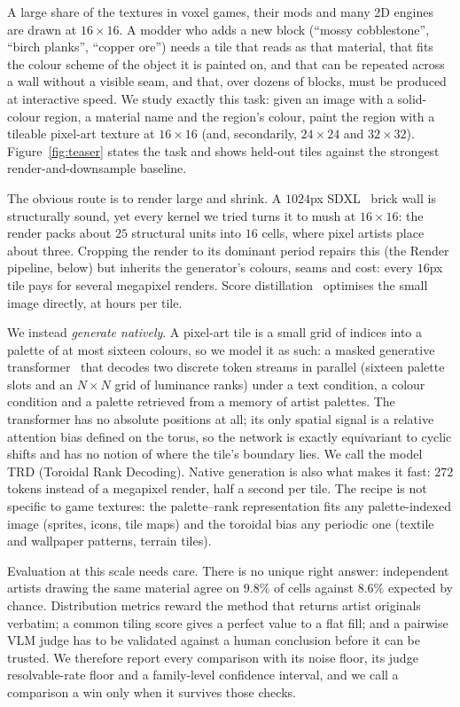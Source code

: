 \documentclass{article}
\newcommand{\trd}{\textsc{TRD}}
\begin{document}
A large share of the textures in voxel games, their mods and many 2D engines
are drawn at $16\times16$. A modder who adds a new block (``mossy
cobblestone'', ``birch planks'', ``copper ore'') needs a tile that reads as
that material, that fits the colour scheme of the object it is painted on, and
that can be repeated across a wall without a visible seam, and that, over
dozens of blocks, must be produced at interactive speed. We study exactly
this task: given an image with a solid-colour region, a material name and the
region's colour, paint the region with a tileable pixel-art texture at
$16\times16$ (and, secondarily, $24\times24$ and $32\times32$).
Figure~\ref{fig:teaser} states the task and shows held-out tiles against the
strongest render-and-downsample baseline.

The obvious route is to render large and shrink. A $1024$px SDXL~\citep{podell2024sdxl}
brick wall is structurally sound, yet every kernel we tried turns it to mush
at $16\times16$: the render packs about $25$ structural units into $16$ cells,
where pixel artists place about three. Cropping the render to its dominant
period repairs this (the Render pipeline, below) but inherits the generator's colours,
seams and cost: every $16$px tile pays for several megapixel renders.
Score distillation~\citep{binninger2024sdpixl} optimises the small image
directly, at hours per tile.

We instead \emph{generate natively}. A pixel-art tile is a small grid of
indices into a palette of at most sixteen colours, so we model it as such: a
masked generative transformer~\citep{chang2022maskgit} that decodes two
discrete token streams in parallel (sixteen palette slots and an $N\times N$
grid of luminance ranks) under a text condition, a colour condition and a
palette retrieved from a memory of artist palettes. The transformer has no
absolute positions at all; its only spatial signal is a relative attention
bias defined on the torus, so the network is exactly equivariant to cyclic
shifts and has no notion of where the tile's boundary lies. We call the model
\trd{} (Toroidal Rank Decoding). Native generation is also what makes it
fast: $272$ tokens instead of a megapixel render, half a second per tile.
The recipe is not specific to game textures: the palette--rank representation
fits any palette-indexed image (sprites, icons, tile maps) and the toroidal
bias any periodic one (textile and wallpaper patterns, terrain tiles).

Evaluation at this scale needs care. There is no unique right answer: independent artists drawing the same material agree on
$9.8\%$ of cells against $8.6\%$ expected by chance. Distribution metrics
reward the method that returns artist originals verbatim; a common tiling score
gives a perfect value to a flat fill; and a pairwise VLM judge has to be
validated against a human conclusion before it can be trusted. We
therefore report every comparison with its noise floor, its judge
resolvable-rate floor and a family-level confidence interval, and we call a
comparison a win only when it survives those checks.
\end{document}
